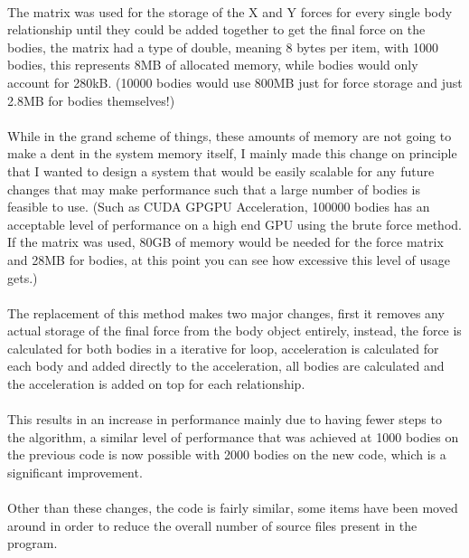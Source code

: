 {\paragraph{}
The matrix was used for the storage of the X and Y forces for every single body relationship until they could be added together to get the final force on the bodies, the matrix had a type of double, meaning 8 bytes per item, with 1000 bodies, this represents 8MB of allocated memory, while bodies would only account for 280kB. (10000 bodies would use 800MB just for force storage and just 2.8MB for bodies themselves!)

\paragraph{}
While in the grand scheme of things, these amounts of memory are not going to make a dent in the system memory itself, I mainly made this change on principle that I wanted to design a system that would be easily scalable for any future changes that may make performance such that a large number of bodies is feasible to use. (Such as CUDA GPGPU Acceleration, 100000 bodies has an acceptable level of performance on a high end GPU using the brute force method. If the matrix was used, 80GB of memory would be needed for the force matrix and 28MB for bodies, at this point you can see how excessive this level of usage gets.)

\paragraph{}
The replacement of this method makes two major changes, first it removes any actual storage of the final force from the body object entirely, instead, the force is calculated for both bodies in a iterative for loop, acceleration is calculated for each body and added directly to the acceleration, all bodies are calculated and the acceleration is added on top for each relationship.

\paragraph{}
This results in an increase in performance mainly due to having fewer steps to the algorithm, a similar level of performance that was achieved at 1000 bodies on the previous code is now possible with 2000 bodies on the new code, which is a significant improvement.

\paragraph{}
Other than these changes, the code is fairly similar, some items have been moved around in order to reduce the overall number of source files present in the program.

}
